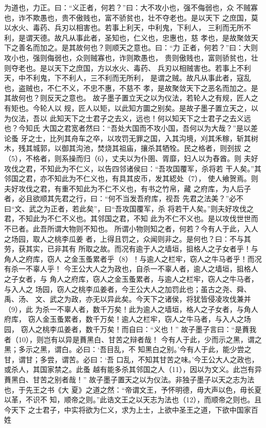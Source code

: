 \documentclass[12pt,UTF8]{ctexbook}
\begin{document}
为道也，力正。曰：“义正者，何若？”曰：大不攻小也，强不侮弱也，众 
不贼寡也，诈不欺愚也，贵不傲贱也，富不骄贫也，壮不夺老也。是以天下 
之庶国，莫以水火、毒药、兵刃以相害也。若事上利天，中利鬼，下利人， 
三利而无所不利，是谓天德。故凡从事此者，圣知也，仁义也，忠惠也，慈 
孝也，是故聚敛天下之善名而加之。是其故何也？则顺天之意也。曰：“力 
正者，何若？”曰：大则攻小也，强则侮弱也，众则贼寡也，诈则欺愚也， 
贵则傲贱也，富则骄贫也，壮则夺老也。是以天下之庶国，方以水火、毒药、 
兵刃以相贼害也。若事上不利天，中不利鬼，下不利人，三不利而无所利， 
是谓之贼。故凡从事此者，寇乱也，盗贼也，不仁不义，不忠不惠，不慈不 
孝，是故聚敛天下之恶名而加之。是其故何也？则反天之意也。 
故子墨子置立天之以为仪法，若轮人之有规，匠人之有矩也。今轮人以 
规，匠人以矩，以此知方圜之别矣。是故子墨子置立天之，以为仪法，吾以 
此知天下之士君子之去义，远也！何以知天下之士君子之去义远也？今知氏 
大国之君宽者然曰：“吾处大国而不攻小国，吾何以为大哉？”是以差论蚤 
牙之士，比列其舟车之卒，以攻罚无罪之国，入其沟境，刈其禾稼，斩其树 
木，残其城郭，以御其沟池，焚烧其祖庙，攘杀其牺牷。民之格者，则刭拔 
之（5），不格者，则系操而归（6），丈夫以为仆圉、胥靡，妇人以为舂酋。则 
夫好攻伐之君，不知此为不仁义，以告四邻诸侯曰：“吾攻国覆军，杀将若 
干人矣。”其邻国之君，亦不知此为不仁义也，有具其皮币，发其綛处（7）， 
使人飨贺焉。则夫好攻伐之君，有重不知此为不仁不义也，有书之竹帛，藏 
之府库，为人后子者，必且欲顺其先君之行，曰：“何不当发吾府库，视吾 
先君之法美？”必不曰“文、武之为正者，若此矣”，曰“吾攻国覆军，杀 
将若干人矣。”则夫好攻伐之君，不知此为不仁不义也。其邻国之君，不知 
此为不仁不义也。是以攻伐世世而不已者。此吾所谓大物则不知也。 
所谓小物则知之者，何若？今有人于此，入人之场园，取人之桃李瓜姜 
者，上得且罚之，众闻则非之。是何也？曰：不与其劳，获其实，已非其有 
所取之故。而况有逾于人之墙垣，抯格人之子女者乎！与角人之府库，窃人 
之金玉蚤累者乎（8）！与逾人之栏牢，窃人之牛马者乎！而况有杀一不辜人乎！ 
今王公大人之为政也，自杀一不辜人者，逾人之墙垣，抯格人之子女者，与 
角人之府库，窃人之金玉蚤累者，与逾人之栏牢，窃人之牛马者，与入人之 
场园，窃人之桃李瓜姜者，今王公大人之加罚此也；虽古之尧、舜、禹、汤、 
文、武之为政，亦无以异此矣。今天下之诸侯，将犹皆侵凌攻伐兼并（9），此 
为杀一不辜人者，数千万矣！此为逾人之墙垣，格人之子女者，与角人府库， 
窃人金玉蚤累者，数千万矣！逾人之栏牢，窃人之牛马者，与入人之场园， 
窃人之桃李瓜姜者，数千万矣！而自曰：“义也！” 
故子墨子言曰：“是蕡我者（10），则岂有以异是蕡黑白、甘苦之辩者哉！ 
今有人于此，少而示之黑，谓之黑；多示之黑，谓白。必曰：‘吾目乱，不 
知黑白之别。’今有人于此，能少尝之甘，谓甘；多尝，谓苦。必曰：‘吾 
口乱，不知其甘苦之味。’今王公大人之政也，或杀人，其国家禁之。此蚤 
越有能多杀其邻国之人（11），因以为文义。此岂有异蕡黑白、甘苦之别者哉！” 
故子墨子置天之以为仪法。非独子墨子以天之志为法也，于先王之书《大 
夏》之道之然：“帝谓文王，予怀明德，毋大声以色，毋长夏以革，不识不 
知，顺帝之则。”此诰文王之以天志为法也（12），而顺帝之则也。且今天下 
之士君子，中实将欲为仁义，求为上士，上欲中圣王之道，下欲中国家百姓 
\end{document}
